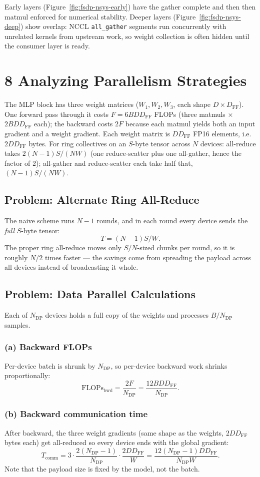 \documentclass[11pt]{article}
\newcommand{\question}[1]{\subsection*{#1}}
\newcommand{\subquestion}[1]{\subsubsection*{#1}}
\begin{document}
Early layers (Figure~\ref{fig:fsdp-nsys-early}) have the gather complete and then then matmul enforced for numerical stability. Deeper layers (Figure~\ref{fig:fsdp-nsys-deep}) show overlap: NCCL \texttt{all\_gather} segments run concurrently with unrelated kernels from upstream work, so weight collection is often hidden until the consumer layer is ready.

\section*{8 Analyzing Parallelism Strategies}

\noindent The MLP block has three weight matrices ($W_1, W_2, W_3$, each shape $D \times D_{\mathrm{FF}}$). One forward pass through it costs $F = 6BDD_{\mathrm{FF}}$ FLOPs (three matmuls $\times$ $2BDD_{\mathrm{FF}}$ each); the backward costs $2F$ because each matmul yields both an input gradient and a weight gradient. Each weight matrix is $DD_{\mathrm{FF}}$ FP16 elements, i.e.\ $2DD_{\mathrm{FF}}$ bytes. For ring collectives on an $S$-byte tensor across $N$ devices: all-reduce takes $2(N{-}1)S/(NW)$ (one reduce-scatter plus one all-gather, hence the factor of 2); all-gather and reduce-scatter each take half that, $(N{-}1)S/(NW)$.

\question{Problem: Alternate Ring All-Reduce}
The naive scheme runs $N{-}1$ rounds, and in each round every device sends the \emph{full} $S$-byte tensor:
\[ T = (N-1)S/W. \]
The proper ring all-reduce moves only $S/N$-sized chunks per round, so it is roughly $N/2$ times faster --- the savings come from spreading the payload across all devices instead of broadcasting it whole.

\question{Problem: Data Parallel Calculations}
Each of $N_{\mathrm{DP}}$ devices holds a full copy of the weights and processes $B/N_{\mathrm{DP}}$ samples.

\subquestion{(a) Backward FLOPs}
Per-device batch is shrunk by $N_{\mathrm{DP}}$, so per-device backward work shrinks proportionally:
\[ \mathrm{FLOPs}_{\mathrm{bwd}} = \frac{2F}{N_{\mathrm{DP}}} = \frac{12BDD_{\mathrm{FF}}}{N_{\mathrm{DP}}}. \]

\subquestion{(b) Backward communication time}
After backward, the three weight gradients (same shape as the weights, $2DD_{\mathrm{FF}}$ bytes each) get all-reduced so every device ends with the global gradient:
\[ T_{\mathrm{comm}} = 3 \cdot \frac{2(N_{\mathrm{DP}}{-}1)}{N_{\mathrm{DP}}} \cdot \frac{2DD_{\mathrm{FF}}}{W} = \frac{12(N_{\mathrm{DP}}{-}1)DD_{\mathrm{FF}}}{N_{\mathrm{DP}} W}. \]
Note that the payload size is fixed by the model, not the batch.
\end{document}
